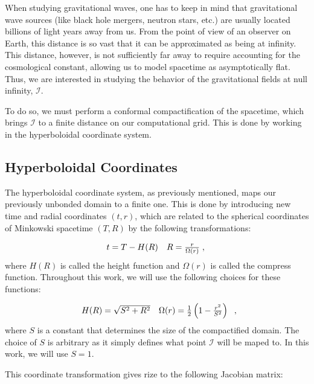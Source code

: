 When studying gravitational waves, one has to keep in mind that gravitational wave sources (like black hole mergers, neutron stars, etc.) are usually located billions of light years away from us. From the point of view of an observer on Earth, this distance is so vast that it can be approximated as being at infinity. This distance, however, is not sufficiently far away to require accounting for the cosmological constant, allowing us to model spacetime as asymptotically flat. Thus, we are interested in studying the behavior of the gravitational fields at null infinity, $\mathscr{I}$.

To do so, we must perform a conformal compactification of the spacetime, which brings $\mathscr{I}$ to a finite distance on our computational grid. This is done by working in the hyperboloidal coordinate system.

\subsection{Hyperboloidal Coordinates}

The hyperboloidal coordinate system, as previously mentioned, maps our previously unbonded domain to a finite one. This is done by introducing new time and radial coordinates $(t,r)$, which are related to the spherical coordinates of Minkowski spacetime $(T,R)$ by the following transformations:

\begin{equation}
    \begin{array}{c c} 
        t = T - H(R) & R = \frac{r}{\Omega(r)} \; ,
    \end{array} \; 
\end{equation}
%
where $H(R)$ is called the height function and $\Omega(r)$ is called the compress function. Throughout this work, we will use the following choices for these functions:

\begin{equation}
    \begin{array}{c c}
        H(R) = \sqrt{S^2+R^2} & \Omega(r) = \frac{1}{2} \left(1 - \frac{r^2}{S^2}\right)
    \end{array} \; ,
\end{equation}
%
where $S$ is a constant that determines the size of the compactified domain. The choice of $S$ is arbitrary as it simply defines what point $\mathscr{I}$ will be maped to. In this work, we will use $S = 1$.

This coordinate transformation gives rize to the following Jacobian matrix:

